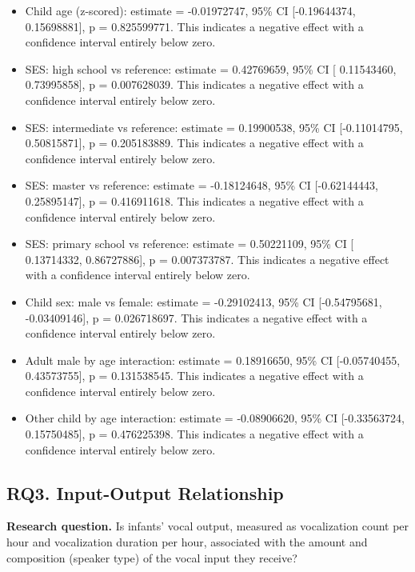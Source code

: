 \documentclass[
  letterpaper,
  DIV=11,
  numbers=noendperiod]{scrartcl}
\providecommand{\tightlist}{%
  \setlength{\itemsep}{0pt}\setlength{\parskip}{0pt}}\usepackage{longtable,booktabs,array}
\begin{document}
\begin{itemize}
\tightlist
\item
  Child age (z-scored): estimate = -0.01972747, 95\% CI {[}-0.19644374,
  0.15698881{]}, p = 0.825599771. This indicates a negative effect with
  a confidence interval entirely below zero.
\item
  SES: high school vs reference: estimate = 0.42769659, 95\% CI {[}
  0.11543460, 0.73995858{]}, p = 0.007628039. This indicates a negative
  effect with a confidence interval entirely below zero.
\item
  SES: intermediate vs reference: estimate = 0.19900538, 95\% CI
  {[}-0.11014795, 0.50815871{]}, p = 0.205183889. This indicates a
  negative effect with a confidence interval entirely below zero.
\item
  SES: master vs reference: estimate = -0.18124648, 95\% CI
  {[}-0.62144443, 0.25895147{]}, p = 0.416911618. This indicates a
  negative effect with a confidence interval entirely below zero.
\item
  SES: primary school vs reference: estimate = 0.50221109, 95\% CI {[}
  0.13714332, 0.86727886{]}, p = 0.007373787. This indicates a negative
  effect with a confidence interval entirely below zero.
\item
  Child sex: male vs female: estimate = -0.29102413, 95\% CI
  {[}-0.54795681, -0.03409146{]}, p = 0.026718697. This indicates a
  negative effect with a confidence interval entirely below zero.
\item
  Adult male by age interaction: estimate = 0.18916650, 95\% CI
  {[}-0.05740455, 0.43573755{]}, p = 0.131538545. This indicates a
  negative effect with a confidence interval entirely below zero.
\item
  Other child by age interaction: estimate = -0.08906620, 95\% CI
  {[}-0.33563724, 0.15750485{]}, p = 0.476225398. This indicates a
  negative effect with a confidence interval entirely below zero.
\end{itemize}

\hypertarget{rq3.-input-output-relationship}{%
\subsection{RQ3. Input-Output
Relationship}\label{rq3.-input-output-relationship}}

\textbf{Research question.} Is infants' vocal output, measured as
vocalization count per hour and vocalization duration per hour,
associated with the amount and composition (speaker type) of the vocal
input they receive?
\end{document}
